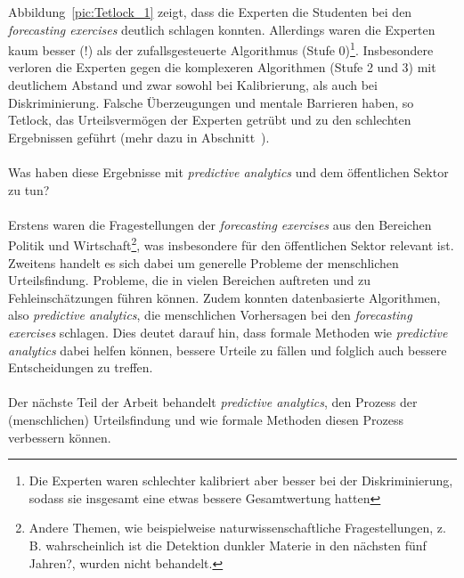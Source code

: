 Abbildung~\ref{pic:Tetlock_1} zeigt, dass die Experten die Studenten bei
den \emph{forecasting exercises} deutlich schlagen konnten. Allerdings waren die
Experten kaum besser (!) als der zufallsgesteuerte Algorithmus 
(Stufe 0)\footnote{Die Experten waren schlechter kalibriert aber besser bei
der Diskriminierung, sodass sie insgesamt eine etwas bessere Gesamtwertung
hatten}. Insbesondere verloren die Experten gegen die komplexeren Algorithmen
(Stufe 2 und 3) mit deutlichem Abstand und zwar sowohl bei Kalibrierung, als
auch bei Diskriminierung. Falsche Überzeugungen und mentale Barrieren haben, so
Tetlock, das Urteilsvermögen der Experten getrübt und zu den schlechten
Ergebnissen geführt (mehr dazu in Abschnitt~\xcom). \\ \\
Was haben diese Ergebnisse mit \emph{predictive analytics} und dem öffentlichen
Sektor zu tun?\\ \\
Erstens waren die Fragestellungen der \emph{forecasting exercises} aus den
Bereichen Politik und Wirtschaft\footnote{
Andere Themen, wie beispielweise naturwissenschaftliche Fragestellungen,
z. B.  wahrscheinlich ist die Detektion dunkler Materie
in den nächsten fünf Jahren?\grqq, wurden nicht behandelt.
}, was insbesondere für den öffentlichen Sektor relevant ist. Zweitens handelt
es sich dabei um generelle Probleme der menschlichen Urteilsfindung.
Probleme, die in vielen Bereichen auftreten und zu Fehleinschätzungen führen
können. Zudem konnten datenbasierte Algorithmen, also
\emph{predictive analytics}, die menschlichen Vorhersagen bei den 
\emph{forecasting exercises} schlagen. Dies deutet darauf hin, dass formale
Methoden wie \emph{predictive analytics} dabei helfen können, bessere Urteile 
zu fällen und folglich auch bessere Entscheidungen zu treffen. \\ \\
Der nächste Teil der Arbeit behandelt \emph{predictive analytics},
den Prozess der (menschlichen) Urteilsfindung und wie formale Methoden diesen
Prozess verbessern können.

